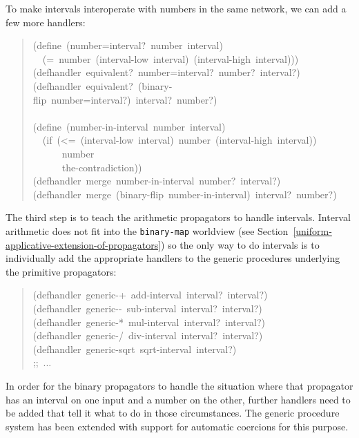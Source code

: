 \documentclass[12pt,letterpaper,english]{article}
\begin{document}
To make intervals interoperate with numbers in the same network,
we can add a few more handlers:
\begin{quote}{\ttfamily \raggedright \noindent
(define~(number=interval?~number~interval)~\\
~~(=~number~(interval-low~interval)~(interval-high~interval)))~\\
(defhandler~equivalent?~number=interval?~number?~interval?)~\\
(defhandler~equivalent?~(binary-flip~number=interval?)~interval?~number?)~\\
~\\
(define~(number-in-interval~number~interval)~\\
~~(if~(<=~(interval-low~interval)~number~(interval-high~interval))~\\
~~~~~~number~\\
~~~~~~the-contradiction))~\\
(defhandler~merge~number-in-interval~number?~interval?)~\\
(defhandler~merge~(binary-flip~number-in-interval)~interval?~number?)
}\end{quote}

The third step is to teach the arithmetic propagators to handle
intervals.  Interval arithmetic does not fit into the \texttt{binary-map}
worldview (see Section~\ref{uniform-applicative-extension-of-propagators})
so the only way to do intervals is to
individually add the appropriate handlers to the generic procedures
underlying the primitive propagators:
\begin{quote}{\ttfamily \raggedright \noindent
(defhandler~generic-+~add-interval~interval?~interval?)~\\
(defhandler~generic-{}-~sub-interval~interval?~interval?)~\\
(defhandler~generic-*~mul-interval~interval?~interval?)~\\
(defhandler~generic-/~div-interval~interval?~interval?)~\\
(defhandler~generic-sqrt~sqrt-interval~interval?)~\\
;;~...
}\end{quote}

In order for the binary propagators to handle the situation where that
propagator has an interval on one input and a number on the other,
further handlers need to be added that tell it what to do in those
circumstances.  The generic procedure system has been extended
with support for automatic coercions for this purpose.
\end{document}
